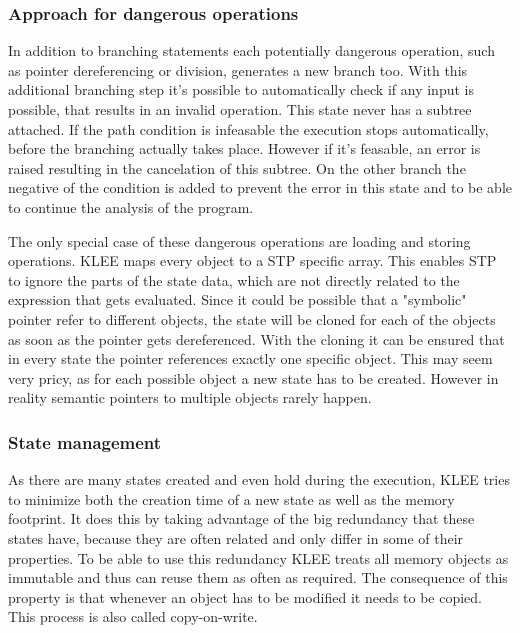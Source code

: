 \subsubsection{Approach for dangerous operations}
In addition to branching statements each potentially dangerous operation, such as pointer dereferencing or division, generates a new branch too. With this additional branching step it's possible to automatically check if any input is possible, that results in an invalid operation. This state never has a subtree attached. If the path condition is infeasable the execution stops automatically, before the branching actually takes place. However if it's feasable, an error is raised resulting in the cancelation of this subtree. On the other branch the negative of the condition is added to prevent the error in this state and to be able to continue the analysis of the program.

The only special case of these dangerous operations are loading and storing operations. KLEE maps every object to a STP specific array. This enables STP to ignore the parts of the state data, which are not directly related to the expression that gets evaluated. Since it could be possible that a "symbolic" pointer refer to different objects, the state will be cloned for each of the objects as soon as the pointer gets dereferenced. With the cloning it can be ensured that in every state the pointer references exactly one specific object. This may seem very pricy, as for each possible object a new state has to be created. However in reality semantic pointers to multiple objects rarely happen. 

\subsubsection{State management}
As there are many states created and even hold during the execution, KLEE tries to minimize both the creation time of a new state as well as the memory footprint. It does this by taking advantage of the big redundancy that these states have, because they are often related and only differ in some of their properties. To be able to use this redundancy KLEE treats all memory objects as immutable and thus can reuse them as often as required. The consequence of this property is that whenever an object has to be modified it needs to be copied. This process is also called copy-on-write.

